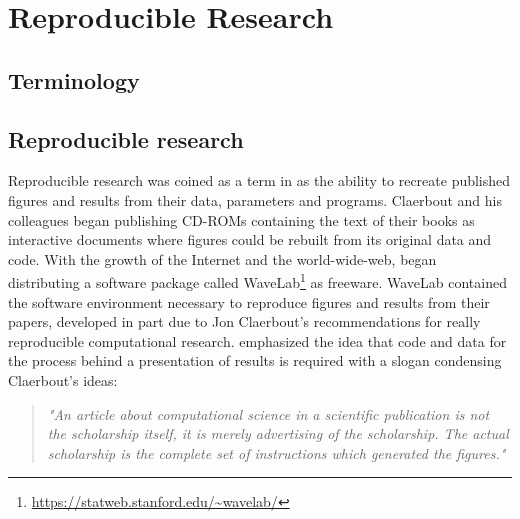 
\chapter{Reproducible Research}

\section{Terminology}

\section{Reproducible research}
Reproducible research was coined as a term in \cite{Claerbout1992} as the ability to recreate published figures and results from their data, parameters and programs. Claerbout and his colleagues began publishing CD-ROMs containing the text of their books as interactive documents where figures could be rebuilt from its original data and code. With the growth of the Internet and the world-wide-web, \cite{Buckheit1995} began distributing a software package called WaveLab\footnote{\url{https://statweb.stanford.edu/~wavelab/}} as freeware. WaveLab contained the software environment necessary to reproduce figures and results from their papers, developed in part due to Jon Claerbout's recommendations for really reproducible computational research. \cite{Buckheit1995} emphasized the idea that code and data for the process behind a presentation of results is required with a slogan condensing Claerbout's ideas: \begin{quote}\emph{"An article about computational science in a scientific publication is \emph{not} the scholarship itself, it is merely \emph{advertising} of the scholarship. The actual scholarship is the complete set of instructions which generated the figures."}\end{quote}

